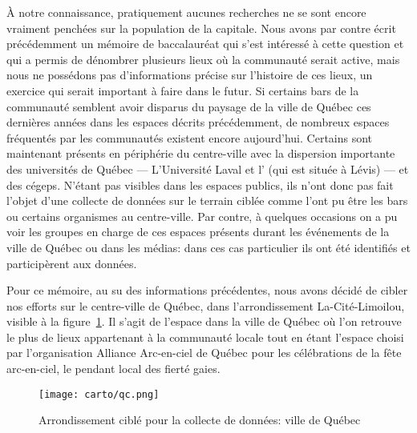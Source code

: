 À notre connaissance, pratiquement aucunes recherches ne se sont encore vraiment penchées sur la population \lgbt{} de la capitale. 
Nous avons par contre écrit précédemment un mémoire de baccalauréat qui s'est intéressé à cette question et qui a permis de dénombrer plusieurs lieux où la communauté serait active, mais nous ne possédons pas d'informations précise sur l'histoire de ces lieux, un exercice qui serait important à faire dans le futur. 
Si certains bars de la communauté semblent avoir disparus du paysage de la ville de Québec ces dernières années dans les espaces décrits précédemment, de nombreux espaces fréquentés par les communautés \lgbt{} existent encore aujourd'hui. 
Certains sont maintenant présents en périphérie du centre-ville avec la dispersion importante des universités de Québec --- L'Université Laval et l'\uqar{} (qui est située à Lévis) --- et des cégeps. 
N'étant pas visibles dans les espaces publics, ils n'ont donc pas fait l'objet d'une collecte de données sur le terrain ciblée comme l'ont pu être les bars ou certains organismes au centre-ville.
Par contre, à quelques occasions on a pu voir les groupes en charge de ces espaces présents durant les événements \lgbt{} de la ville de Québec ou dans les médias: dans ces cas particulier ils ont été identifiés et participèrent aux données.

Pour ce mémoire, au su des informations précédentes, nous avons décidé de cibler nos efforts sur le centre-ville de Québec, dans l'arrondissement La-Cité-Limoilou, visible à la figure~\ref{fig:espaces_quebec}. 
Il s'agit de l'espace dans la ville de Québec où l'on retrouve le plus de lieux appartenant à la communauté \lgbt{} locale tout en étant l'espace choisi par l'organisation Alliance Arc-en-ciel de Québec pour les célébrations de la fête arc-en-ciel, le pendant local des fierté gaies.

\label{ssub:la_ville_de_quebec}
\begin{figure}[ht]
	\centering
	\texttt{[image: carto/qc.png]}
	\caption{Arrondissement ciblé pour la collecte de données: ville de
    Québec}\label{fig:espaces_quebec}
\end{figure}


